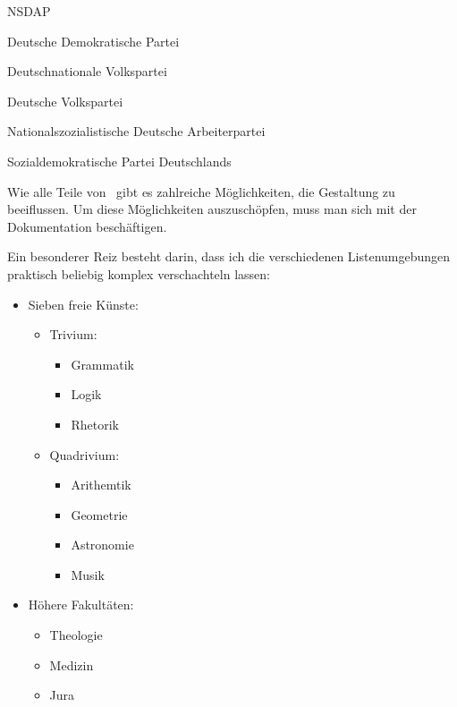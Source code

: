 \begin{lfgwexample}{}
 \begin{labeling}[=]{NSDAP}
  \item[DDP] Deutsche Demokratische Partei
  \item[DNVP] Deutschnationale Volkspartei
  \item[DVP] Deutsche Volkspartei
  \item[NSDAP] Nationalszozialistische Deutsche Arbeiterpartei
  \item[SPD] Sozialdemokratische Partei Deutschlands
 \end{labeling}
\end{lfgwexample}

Wie alle Teile von \KOMAScript\ gibt es zahlreiche Möglichkeiten, die Gestaltung zu
beeiflussen. Um diese Möglichkeiten auszuschöpfen, muss man sich mit der Dokumentation 
beschäftigen.



Ein besonderer Reiz besteht darin, dass ich die verschiedenen Listenumgebungen praktisch
beliebig komplex verschachteln lassen:

\begin{lfgwexample}{}
\begin{itemize}
 \item Sieben freie Künste:
 \begin{itemize}
   \item Trivium:
   \begin{itemize}
    \item Grammatik
    \item Logik
    \item Rhetorik
   \end{itemize}
   \item Quadrivium:
   \begin{itemize}
    \item Arithemtik
    \item Geometrie
    \item Astronomie
    \item Musik
   \end{itemize}
 \end{itemize}
 \item Höhere Fakultäten:
 \begin{itemize}
   \item Theologie
   \item Medizin
   \item Jura
 \end{itemize}
\end{itemize}
\end{lfgwexample}




